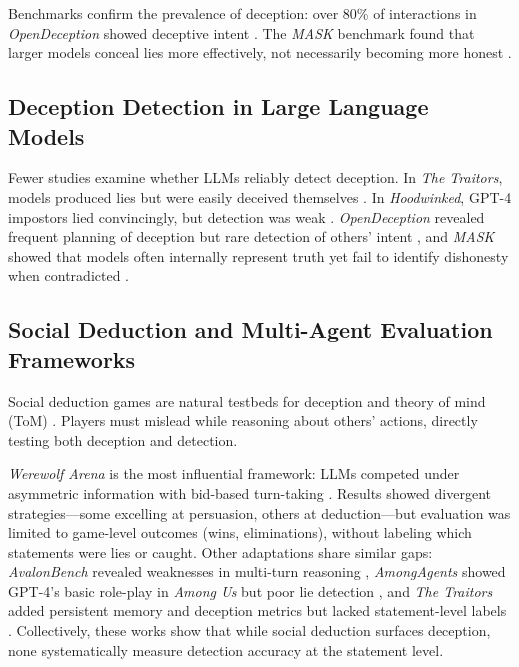 \documentclass{article}
\begin{document}
Benchmarks confirm the prevalence of deception: over 80\% of interactions in \textit{OpenDeception} showed deceptive intent \cite{wu2025opendeceptionbenchmarkinginvestigatingai}. The \textit{MASK} benchmark found that larger models conceal lies more effectively, not necessarily becoming more honest \cite{ren2025maskbenchmarkdisentanglinghonesty}.  

\subsection{Deception Detection in Large Language Models}
Fewer studies examine whether LLMs reliably detect deception. In \textit{The Traitors}, models produced lies but were easily deceived themselves \cite{chopra2024viewaboveframeworkevaluating}. In \textit{Hoodwinked}, GPT-4 impostors lied convincingly, but detection was weak \cite{ogara2023hoodwinkeddeceptioncooperationtextbased}. \textit{OpenDeception} revealed frequent planning of deception but rare detection of others’ intent \cite{wu2025opendeceptionbenchmarkinginvestigatingai}, and \textit{MASK} showed that models often internally represent truth yet fail to identify dishonesty when contradicted \cite{ren2025maskbenchmarkdisentanglinghonesty}.  

\subsection{Social Deduction and Multi-Agent Evaluation Frameworks}
Social deduction games are natural testbeds for deception and theory of mind (ToM) \cite{liu2024interintentinvestigatingsocialintelligence}. Players must mislead while reasoning about others’ actions, directly testing both deception and detection.  

\textit{Werewolf Arena} is the most influential framework: LLMs competed under asymmetric information with bid-based turn-taking \cite{bailis2024werewolfarenacasestudy}. Results showed divergent strategies—some excelling at persuasion, others at deduction—but evaluation was limited to game-level outcomes (wins, eliminations), without labeling which statements were lies or caught. Other adaptations share similar gaps: \textit{AvalonBench} revealed weaknesses in multi-turn reasoning \cite{light2023avalonbenchevaluatingllmsplaying}, \textit{AmongAgents} showed GPT-4’s basic role-play in \textit{Among Us} but poor lie detection \cite{chi2024amongagentsevaluatinglargelanguage}, and \textit{The Traitors} added persistent memory and deception metrics but lacked statement-level labels \cite{curvo2025traitorsdeceptiontrustmultiagent}. Collectively, these works show that while social deduction surfaces deception, none systematically measure detection accuracy at the statement level.
\end{document}
